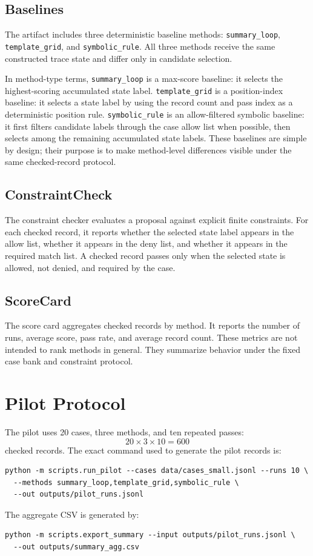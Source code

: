 \documentclass[11pt]{article}
\begin{document}
\subsection{Baselines}

The artifact includes three deterministic baseline methods:
\texttt{summary\_loop}, \texttt{template\_grid}, and \texttt{symbolic\_rule}.
All three methods receive the same constructed trace state and differ only in
candidate selection.

In method-type terms, \texttt{summary\_loop} is a max-score baseline: it
selects the highest-scoring accumulated state label. \texttt{template\_grid} is
a position-index baseline: it selects a state label by using the record count
and pass index as a deterministic position rule. \texttt{symbolic\_rule} is an
allow-filtered symbolic baseline: it first filters candidate labels through the
case allow list when possible, then selects among the remaining accumulated
state labels. These baselines are simple by design; their purpose is to make
method-level differences visible under the same checked-record protocol.

\subsection{ConstraintCheck}

The constraint checker evaluates a proposal against explicit finite
constraints. For each checked record, it reports whether the selected state
label appears in the allow list, whether it appears in the deny list, and
whether it appears in the required match list. A checked record passes only
when the selected state is allowed, not denied, and required by the case.

\subsection{ScoreCard}

The score card aggregates checked records by method. It reports the number of
runs, average score, pass rate, and average record count. These metrics are not
intended to rank methods in general. They summarize behavior under the fixed
case bank and constraint protocol.

\section{Pilot Protocol}

The pilot uses 20 cases, three methods, and ten repeated passes:
\[
20 \times 3 \times 10 = 600
\]
checked records. The exact command used to generate the pilot records is:
\begin{verbatim}
python -m scripts.run_pilot --cases data/cases_small.jsonl --runs 10 \
  --methods summary_loop,template_grid,symbolic_rule \
  --out outputs/pilot_runs.jsonl
\end{verbatim}
The aggregate CSV is generated by:
\begin{verbatim}
python -m scripts.export_summary --input outputs/pilot_runs.jsonl \
  --out outputs/summary_agg.csv
\end{verbatim}
\end{document}
